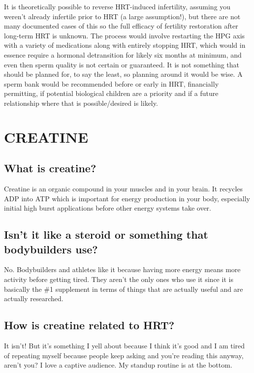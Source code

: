 \documentclass{article}
\begin{document}
{{It is theoretically possible to reverse HRT-induced infertility, assuming you weren't already infertile prior to HRT (a large assumption!), but there are not many documented cases of this so the full efficacy of fertility restoration after long-term HRT is unknown. The process would involve restarting the HPG axis with a variety of medications along with entirely stopping HRT, which would in essence require a hormonal detransition for likely six months at minimum, and even then sperm quality is not certain or guaranteed. It is not something that should be planned for, to say the least, so planning around it would be wise. A sperm bank would be recommended before or early in HRT, financially permitting, if potential biological children are a priority and if a future relationship where that is possible/desired is likely.



\section{CREATINE}

\subsection{What is creatine?}

Creatine is an organic compound in your muscles and in your brain. It recycles ADP into ATP which is important for energy production in your body, especially initial high burst applications before other energy systems take over.

\subsection{Isn’t it like a steroid or something that bodybuilders use?}

No. Bodybuilders and athletes like it because having more energy means more activity before getting tired. They aren’t the only ones who use it since it is basically the \#1 supplement in terms of things that are actually useful and are actually researched. 

\subsection{How is creatine related to HRT?}

It isn’t! But it’s something I yell about because I think it’s good and I am tired of repeating myself because people keep asking and you’re reading this anyway, aren’t you? I love a captive audience. My standup routine is at the bottom.

}}
\end{document}
